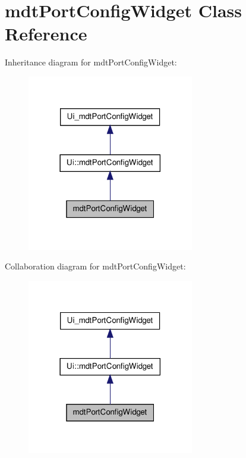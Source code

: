 \hypertarget{classmdt_port_config_widget}{
\section{mdtPortConfigWidget Class Reference}
\label{classmdt_port_config_widget}
}


Inheritance diagram for mdtPortConfigWidget:\nopagebreak
\begin{figure}[H]
\begin{center}
\leavevmode
\includegraphics[width=206pt]{classmdt_port_config_widget__inherit__graph}
\end{center}
\end{figure}


Collaboration diagram for mdtPortConfigWidget:\nopagebreak
\begin{figure}[H]
\begin{center}
\leavevmode
\includegraphics[width=206pt]{classmdt_port_config_widget__coll__graph}
\end{center}
\end{figure}
